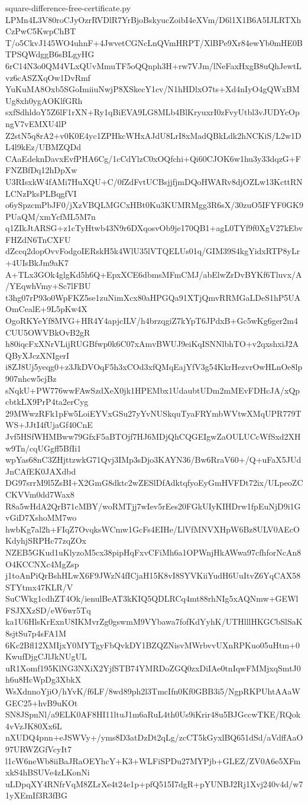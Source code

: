 \documentclass[11pt]{article}
\theoremstyle{definition}
\theoremstyle{remark}
\begin{document}
\begin{filecontents*}[overwrite]{square-difference-free-certificate.py}
LPMn4L3V80roCJyOzrRVDlR7YrBjoBskyucZoibI4eXVm/D6l1X1B6A5IJLRTXhCzPwC5KwpChBT
T/o5CkvJ145WO4uhnF+4JwvetCGNcLnQVmHRPT/XlBPe9Xr84ewYb0mHE0BTPSQWdggB6sBLgyHG
6rC14N3o0QM4VLxQUvMmuTF5oQQnph3H+rw7VJm/lNeFaxHxgB8uQhJewtLvz6cASZXqOw1DvRmf
YuKuMA8Oxb5SGoImiiuNwjP8XSkecY1cv/N1hHDlxO7ts+Xd4nIyO4gQWxBMUg8xh0ygAOKlfGRh
sxfSdhldoY5Z6lF1rXN+Ry1qBiEVA9LG8MLb4BlKryuxrI0zFvyUtbl3vJUDYcOpngV7vEMXU4lP
Z2stN5q8rA2+v0K0E4yc1ZPHkcWHxAJdU8LrI8xMadQBkLdk2hNCKiS/L2w1DL4l9kEz/UBMZQDd
CAaEdeknDavxEvfPHA6Cg/1cCdYlzC0xOQfchi+Qi60CJOK6w1hu3y33dqzG+FFNZBfDq12hDpXw
U3RIsxkW4fAMi7HuXQU+C/0fZdFvtUCBsjjfjmDQoHWARv8djOZLw13KcttRNLCNzPksPLBqgfVI
o6ySpzcmPbJF0/jXzVBQLMGCxHBt0Ku3KUMRMgg3R6sX/30zuO5IFYF0GK9PUaQM/xmYcfML5M7n
q1ZIkJtARSG+z1cTyHtwb43N9r6DXqosvOb9je170QB1+agL0TYf9f0XgV27kEbvFHZdN6TnCXFU
dZccq2dopOvvFodgoIERskH5k4WlU35lVTQELUs01q/GIM39S4kgYidxRTP8yLr+4UIsBkJm9aK7
A+TLx3GOk4glgKd5h6Q+EpxXCE6dbmsMFmCMJ/abElwZrDvBYKf6Tluvx/A/YEqwhVmy+Sc7lFBU
t3hg07rP93o0WpFKZ5se1zuNimXcx80aHPGQa91XTjQmvRRMGaLDeS1hP5UAOmCealE+9L5pKw4X
OgoRKYeYf8MVG+HR4Y4apjcILV/h4brzqgiZ7kYpT6JPdxB+Gc5wKg6ger2m4CUU5OWVBkOvB2gR
h80iqcFxXNrVLijRUGBfwp0k6C07xAmvBWUJ9eiKqISNNlbhTO+v2qxshxiJ2AQByXJczXNIgerI
i8ZJ8Uj5yeqg0+z3JkDVOqF5h3xCOd3xfQMqEajYfV3g54KkrHezvrOwHLnOe8lp907nhcw5cjBz
sNqkU+PW776wwFAwSzdXeX0jk1HPEMbx1UdaubtUDm2mMEvFDHcJA/xQpcbtkLX9PrP4ta2erCyg
29MWwzRFk1pFw5LoiEYVxGSu27yYvNUSkquTyaFRYmbWVtwXMqUPR779TWS+JJtI4fUjaGf40CnE
Jvf5HSfWHMBww79GfxF5aBTOjf7HJ6MDjQhCQGEIgwZaOULUCcWfSxd2XHw9Tn/cqUGgff5BfIi1
wpYas68nC3ZHjttzwkG71Qvj3IMp3sDjo3KAYN36/Bw6RraV60+/Q+uFaX5JUdJnCAfEK0JAXdbd
DG97srrM9l5ZsBI+X2GmG8dktc2wZESlDfAdktqfyoEyGmHVFDt72ix/ULpeoZCCKVVm0dd7Wax8
R8a5wHdA2QrB71cMBY/woRMTjj7wIev5rEes20FGkUIyKIHDrw1fpEuNjD9i1GvGiD7XshoMM7wo
hwbKg7al2h+FIqZ7OvqksWCmw1GcFs4EIHe/LlVfMNVXHpW6Bz8ULV0AEcOKdyhjSRPHc77zqZOx
NZEB5GKud1uKlyzoM5cx38pipHqFxvCFiMh6a1OPWnjHkAWwa97cfhforNcAn8O4KCCNXc4MgZsp
j1toAnPiQrBshHLwX6F9JWzN4fICjaH15K8vI8SYVKiiYudH6UuItvZ6YqCAX58STYtmx47KLR/V
SuCWkg1cdhZT4Ok/ienulBeAT3kKIQ5QDLRCq4mt88rhNIg5xAQNmw+GEWlFSJXXzSD/eW6wr5Tq
ka1U6HlsKrExnU8IKMvrZg0gswmM9VYbawa7fofKdYyhK/UTHlllHKGCbSlSaK8sjtSu7p4sFA1M
6Kc2Bfl12XMIjxY0MYTgyFbQvkDY1BZQZNisvMWrbvvUXnRPKuo05uHtm+0KwufDjgCJlJkNUgUL
uR1Xomf195KlNG3NXiX2YjfSTB74YMRDoZGQ0zxDiIAe0tnIqwFMMjxqSmtJ0h6u8HcWpDg3XbkX
WsXdnnoYjiO/hYvK/f6LF/8wd89ph2l3TmcIfn0Kf0GBB3i5/NgpRKPUhtAAaWGEC25+hvB9uKOt
SN8JSpnNl/a9ELK0AF8HI11ltuJ1m6aRuL4th0Us9iKrir48u5BJGccwTKE/RQok4vVzJK80Xx6L
nXUDQ4pnn+eJSWVy+/yms8D3atDzDt2qLg/zcCT5kGyxlBQ651dSd/aVdffAaO97URWZGfVcyIt7
l1cW6neWb8iiBaJRaOEYhcY+K3+WLFiSPDu27MYPjb+GLEZ/ZV0A6e5XFmxkS4hBSUVe4zLKonNi
uLDpqXY4RNfrVqM8ZLrXe4t24e1p+pfQ515I7dgR+pYUNBJ2Rj1Xvj240v4d/w71yXEmIf3R3fBG

\end{filecontents*}
\end{document}
